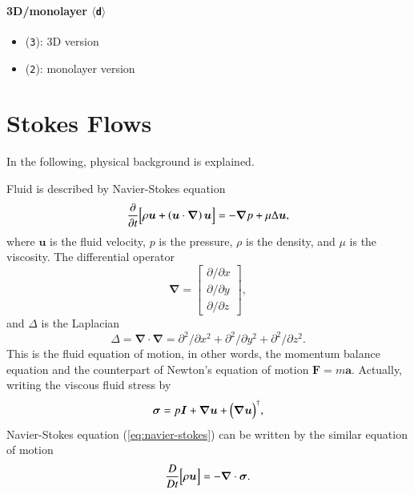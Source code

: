 \documentclass{book}
\begin{document}
\paragraph{3D/monolayer $\langle${\tt d}$\rangle$}
\begin{itemize}
\item ({\tt 3}): 3D version
\item ({\tt 2}): monolayer version
\end{itemize}


\section{Stokes Flows}
In the following, physical background is explained.

Fluid is described by Navier-Stokes equation
\begin{equation}
  \frac{\partial}{\partial t}
  \Bigl[
    \rho
    \bm{u}
    +
    \left(
      \bm{u}
      \cdot
      \bm{\nabla}
    \right)
    \bm{u}
  \Bigr]
  =
  -
  \bm{\nabla}
  p
  +
  \mu
  \Delta
  \bm{u}
  ,
  \label{eq:navier-stokes}
\end{equation}
where $\bm{u}$ is the fluid velocity,
$p$ is the pressure, $\rho$ is the density,
and $\mu$ is the viscosity.
The differential operator
\begin{equation}
  \bm{\nabla}
  =
  \left[
    \begin{array}{c}
      \partial/\partial x\\
      \partial/\partial y\\
      \partial/\partial z
    \end{array}
  \right]
  ,
\end{equation}
and $\Delta$ is the Laplacian
\begin{equation}
  \Delta
  =
  \bm{\nabla}
  \cdot
  \bm{\nabla}
  =
  \partial^2/\partial x^2
  +
  \partial^2/\partial y^2
  +
  \partial^2/\partial z^2
  .
\end{equation}
This is the fluid equation of motion, in other words,
the momentum balance equation and the counterpart of
Newton's equation of motion $\bm{F} = m\bm{a}$.
Actually, writing the viscous fluid stress by
\begin{equation}
  \bm{\sigma}
  =
  p
  \bm{I}
  +
  \bm{\nabla}\bm{u}
  +
  \Bigl(
  \bm{\nabla}\bm{u}
  \Bigr)^\dagger
  ,
\end{equation}
Navier-Stokes equation (\ref{eq:navier-stokes}) can be written by
the similar equation of motion
\begin{equation}
  \frac{D}{D t}
  \Bigl[
    \rho
    \bm{u}
  \Bigr]
  =
  -
  \bm{\nabla}
  \cdot
  \bm{\sigma}
  .
\end{equation}
\end{document}
